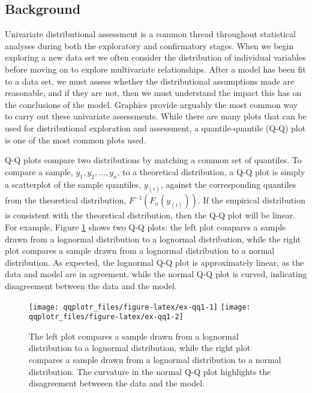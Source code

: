 \subsection{Background}\label{background}

\label{sec:background}

Univariate distributional assessment is a common thread throughout
statistical analyses during both the exploratory and confirmatory
stages. When we begin exploring a new data set we often consider the
distribution of individual variables before moving on to explore
multivariate relationships. After a model has been fit to a data set, we
must assess whether the distributional assumptions made are reasonable,
and if they are not, then we must understand the impact this has on the
conclusions of the model. Graphics provide arguably the most common way
to carry out these univariate assessments. While there are many plots
that can be used for distributional exploration and assessment, a
quantile-quantile (Q-Q) plot \citep{Wilk1968-ii} is one of the most
common plots used.

Q-Q plots compare two distributions by matching a common set of
quantiles. To compare a sample, \(y_1, y_2, \ldots, y_n\), to a
theoretical distribution, a Q-Q plot is simply a scatterplot of the
sample quantiles, \(y_{(i)}\), against the corresponding quantiles from
the theoretical distribution, \(F^{-1}\left( F_n(y_{(i)}) \right)\). If
the empirical distribution is consistent with the theoretical
distribution, then the Q-Q plot will be linear. For example, Figure
\ref{fig:ex-qq1} shows two Q-Q plots: the left plot compares a sample
drawn from a lognormal distribution to a lognormal distribution, while
the right plot compares a sample drawn from a lognormal distribution to
a normal distribution. As expected, the lognormal Q-Q plot is
approximately linear, as the data and model are in agreement, while the
normal Q-Q plot is curved, indicating disagreement between the data and
the model.

\begin{Schunk}
\begin{figure}

{\centering \texttt{[image: qqplotr\_files/figure-latex/ex-qq1-1]} \texttt{[image: qqplotr\_files/figure-latex/ex-qq1-2]} 

}

\caption[The left plot compares a sample drawn from a lognormal distribution to a lognormal distribution, while the right plot compares a sample drawn from a lognormal distribution to a normal distribution]{The left plot compares a sample drawn from a lognormal distribution to a lognormal distribution, while the right plot compares a sample drawn from a lognormal distribution to a normal distribution. The curvature in the normal Q-Q plot highlights the disagreement betweeen the data and the model.}\label{fig:ex-qq1}
\end{figure}
\end{Schunk}

